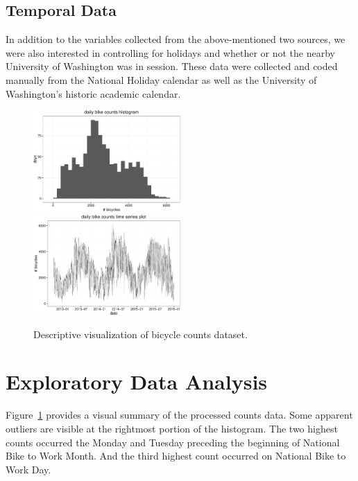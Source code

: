 \documentclass [11pt, proquest] {uwthesis}[2015/03/03]
\begin{document}
\subsection{Temporal Data}
In addition to the variables collected from the above-mentioned two sources, we were also interested in controlling for holidays and whether or not the nearby University of Washington was in session. These data were collected and coded manually from the National Holiday calendar as well as the University of Washington's historic academic calendar.

\begin{figure}
  \centering
    \includegraphics[width=0.5\textwidth]{figures/daily_hist} \hfill
    \includegraphics[width=0.5\textwidth]{figures/daily_tscount_plot}
  \caption{Descriptive visualization of bicycle counts dataset.}
  \label{fig:descriptives}
\end{figure}


\section{Exploratory Data Analysis}
\label{sec:eda}
Figure~\ref{fig:descriptives} provides a visual summary of the processed counts data. Some apparent outliers are visible at the rightmost portion of the histogram. The two highest counts occurred the Monday and Tuesday preceding the beginning of National Bike to Work Month. And the third highest count occurred on National Bike to Work Day.
\end{document}

